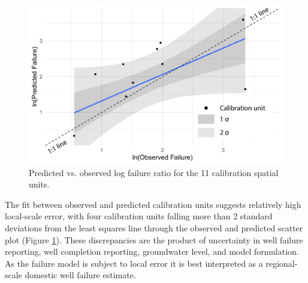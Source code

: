 \begin{figure}[H]
	\includegraphics[width=\textwidth]{ch2_appendix_figs/erl_calibration_pred_obs_line_GF.pdf}
	\caption{Predicted vs. observed log failure ratio for the 11 calibration spatial units. }
	\label{fig:calib_line}
\end{figure}

The fit between observed and predicted calibration units suggests relatively high local-scale error, with four calibration units falling more than 2 standard deviations from the least squares line through the observed and predicted scatter plot (Figure \ref{fig:calib_line}). These discrepancies are the product of uncertainty in well failure reporting, well completion reporting, groundwater level, and model formulation. As the failure model is subject to local error it is best interpreted as a regional-scale domestic well failure estimate. 

\clearpage



